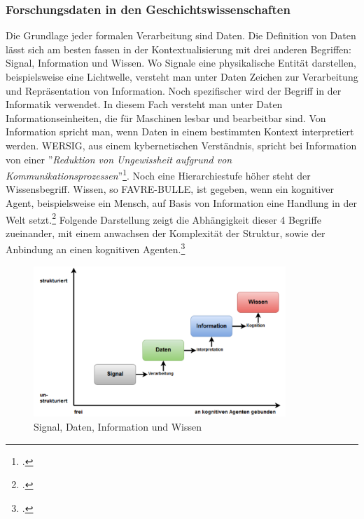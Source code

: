 \documentclass[12pt,a4paper]{article}
\begin{document}
\subsubsection{Forschungsdaten in den Geschichtswissenschaften}

Die Grundlage jeder formalen Verarbeitung sind Daten. Die Definition von Daten lässt sich am besten fassen in der Kontextualisierung mit drei anderen Begriffen: Signal, Information und Wissen. Wo Signale eine physikalische Entität darstellen, beispielsweise eine Lichtwelle, versteht man unter Daten Zeichen zur Verarbeitung und Repräsentation von Information. Noch spezifischer wird der Begriff in der Informatik verwendet. In diesem Fach versteht man unter Daten Informationseinheiten, die für Maschinen lesbar und bearbeitbar sind. Von Information spricht man, wenn Daten in einem bestimmten Kontext interpretiert werden. WERSIG, aus einem kybernetischen Verständnis, spricht bei Information von einer ''\textit{Reduktion von Ungewissheit aufgrund von Kommunikationsprozessen}''\footcite[][S.74]{wersig1971information}. Noch eine Hierarchiestufe höher steht der Wissensbegriff. Wissen, so FAVRE-BULLE, ist gegeben, wenn ein kognitiver Agent, beispielsweise ein Mensch, auf Basis von Information eine Handlung in der Welt setzt.\footcite[][S.93-97]{favre2001information} Folgende Darstellung zeigt die Abhängigkeit dieser 4 Begriffe zueinander, mit einem anwachsen der Komplexität der Struktur, sowie der Anbindung an einen kognitiven Agenten.\footcite[Eine ausführlichere Auseinandersetzung mit den Begriffen Daten, Information und Wissen findet sich in meiner ersten Abschlussarbeit.][Masterarbeit Graz, S.20-28]{pollin2017suchen}
\begin{figure}[H]
\centering
	\includegraphics[width=0.85\textwidth]{img/daten.png}  
    \caption[Signal, Daten, Information und Wissen. POLLIN Christopher: Vom Suchen, Stöbern und Finden : Information Retrieval am Beispiel der Digitalen Sammlung des Hans Gross Kriminalmuseums, Masterarbeit Graz, S.21 ]{Signal, Daten, Information und Wissen} \label{fig:daten}
\end{figure} 
\end{document}
